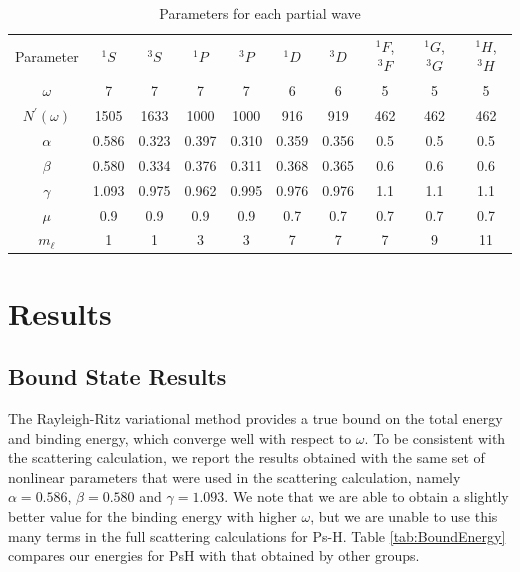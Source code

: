 \documentclass[preprint,showpacs,preprintnumbers,amsmath,amssymb]{revtex4}
\begin{document}
\begin{table}[H]
  \centering
	\begin{ruledtabular}
    \begin{tabular}{cccccccccc}
    Parameter & $^1S$ & $^3S$ & $^1P$ & $^3P$ & $^1D$ & $^3D$ & $^1F$, $^3F$ & $^1G$, $^3G$ & $^1H$, $^3H$ \\
    \colrule
	$\omega$           & 7     & 7     & 7     & 7     & 6     & 6     & 5    & 5   & 5 \\
	$N^\prime(\omega)$ & 1505  & 1633  & 1000  & 1000  & 916   & 919   & 462  & 462 & 462 \\
	$\alpha$           & 0.586 & 0.323 & 0.397 & 0.310 & 0.359 & 0.356 & 0.5  & 0.5 & 0.5 \\
	$\beta$            & 0.580 & 0.334 & 0.376 & 0.311 & 0.368 & 0.365 & 0.6  & 0.6 & 0.6 \\
	$\gamma$           & 1.093 & 0.975 & 0.962 & 0.995 & 0.976 & 0.976 & 1.1  & 1.1 & 1.1 \\
	$\mu$              & 0.9   & 0.9   & 0.9   & 0.9   & 0.7   & 0.7   & 0.7  & 0.7 & 0.7 \\
	$m_\ell$           & 1     & 1     & 3     & 3     & 7     & 7     & 7    & 9   & 11 \\
    \end{tabular}
  \end{ruledtabular}
  \caption{Parameters for each partial wave}
  \label{tab:Nonlinear}
\end{table}





\section{Results}
\label{sec:Results}


\subsection{Bound State Results}

The Rayleigh-Ritz variational method provides a true bound on the total energy and binding energy, which converge well with respect to $\omega$. To be consistent with the scattering calculation, we report the results obtained with the same set of nonlinear parameters that were used in the scattering calculation, namely $\alpha = 0.586$, $\beta = 0.580$ and $\gamma = 1.093$. We note that we are able to obtain a slightly better value for the binding energy with higher $\omega$, but we are unable to use this many terms in the full scattering calculations for Ps-H. Table \ref{tab:BoundEnergy} compares our energies for PsH with that obtained by other groups.
\end{document}
